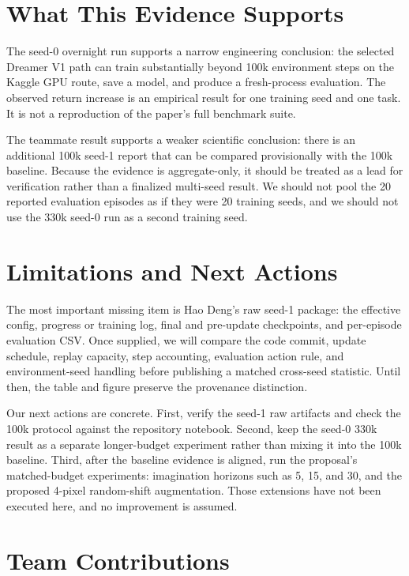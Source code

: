 \documentclass{article}
\begin{document}
\section{What This Evidence Supports}

The seed-0 overnight run supports a narrow engineering conclusion: the selected Dreamer V1 path can train substantially beyond 100k environment steps on the Kaggle GPU route, save a model, and produce a fresh-process evaluation. The observed return increase is an empirical result for one training seed and one task. It is not a reproduction of the paper's full benchmark suite.

The teammate result supports a weaker scientific conclusion: there is an additional 100k seed-1 report that can be compared provisionally with the 100k baseline. Because the evidence is aggregate-only, it should be treated as a lead for verification rather than a finalized multi-seed result. We should not pool the 20 reported evaluation episodes as if they were 20 training seeds, and we should not use the 330k seed-0 run as a second training seed.

\section{Limitations and Next Actions}

The most important missing item is Hao Deng's raw seed-1 package: the effective config, progress or training log, final and pre-update checkpoints, and per-episode evaluation CSV. Once supplied, we will compare the code commit, update schedule, replay capacity, step accounting, evaluation action rule, and environment-seed handling before publishing a matched cross-seed statistic. Until then, the table and figure preserve the provenance distinction.

Our next actions are concrete. First, verify the seed-1 raw artifacts and check the 100k protocol against the repository notebook. Second, keep the seed-0 330k result as a separate longer-budget experiment rather than mixing it into the 100k baseline. Third, after the baseline evidence is aligned, run the proposal's matched-budget experiments: imagination horizons such as 5, 15, and 30, and the proposed 4-pixel random-shift augmentation. Those extensions have not been executed here, and no improvement is assumed.

\section*{Team Contributions}
\end{document}
